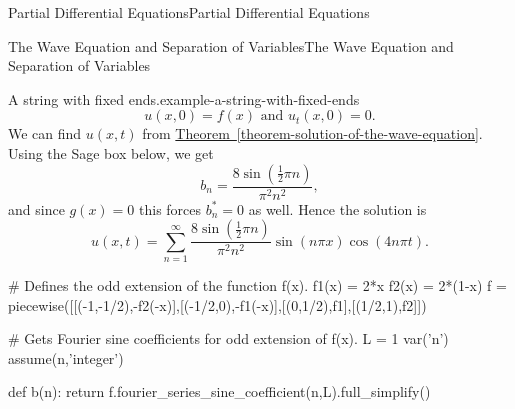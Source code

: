 \documentclass[10pt,]{book}
\numberwithin{equation}{section}
\begin{document}
\begin{chapterptx}{Partial Differential Equations}{}{Partial Differential Equations}{}{}
\begin{sectionptx}{The Wave Equation and Separation of Variables}{}{The Wave Equation and Separation of Variables}{}{}
\begin{example}{A string with fixed ends.}{example-a-string-with-fixed-ends}
\begin{equation*}
u(x,0) = f(x)\text{ and }u_{t}(x,0) = 0.
\end{equation*}
\hypertarget{p-479}{}%
We can find \(u(x,t)\) from \hyperref[theorem-solution-of-the-wave-equation]{Theorem~\ref{theorem-solution-of-the-wave-equation}}. Using the Sage box below, we get%
%
\begin{equation*}
b_{n} = \frac{8\sin\left(\frac{1}{2} \pi n\right)}{\pi^{2} n^{2}},
\end{equation*}
\hypertarget{p-480}{}%
and since \(g(x) = 0\) this forces \(b^{*}_{n} = 0\) as well. Hence the solution is%
%
\begin{equation*}
u(x,t) = \sum_{n=1}^{\infty}\frac{8\sin\left(\frac{1}{2} \pi n\right)}{\pi^{2} n^{2}}\sin(n\pi x)\cos(4n\pi t).
\end{equation*}
\end{example}
\begin{sageinput}
  # Defines the odd extension of the function f(x).
f1(x) = 2*x
f2(x) = 2*(1-x)
f = piecewise([[(-1,-1/2),-f2(-x)],[(-1/2,0),-f1(-x)],[(0,1/2),f1],[(1/2,1),f2]])

# Gets Fourier sine coefficients for odd extension of f(x).
L = 1
var('n')
assume(n,'integer')

def b(n):
    return f.fourier_series_sine_coefficient(n,L).full_simplify()   


\end{sageinput}
\end{sectionptx}
\end{chapterptx}
\end{document}
